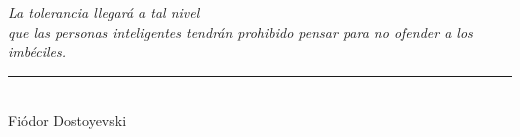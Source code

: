 \chapter*{} %

\begin{flushright}
    \textit{La tolerancia llegará a tal nivel \\ que las personas inteligentes tendrán prohibido pensar para no ofender a los imbéciles. 
    } \\
    \rule{5cm}{0.5pt} %
    \\ Fiódor Dostoyevski
\end{flushright}


